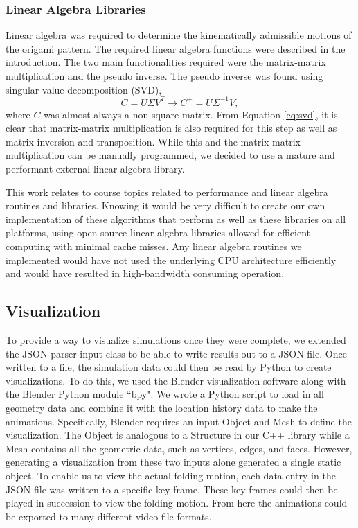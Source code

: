\subsubsection{Linear Algebra Libraries}
Linear algebra was required to determine the kinematically admissible motions of the origami pattern. The required linear algebra functions were described in the introduction. The two main functionalities required were the matrix-matrix multiplication and the pseudo inverse. The pseudo inverse was found using singular value decomposition (SVD),
\begin{equation} \label{eq:svd}
    C=U\Sigma V^T \longrightarrow C^+=U\Sigma ^{-1} V,
\end{equation}
where $C$ was almost always a non-square matrix. From Equation \ref{eq:svd}, it is clear that matrix-matrix multiplication is also required for this step as well as matrix inversion and transposition. While this and the matrix-matrix multiplication can be manually programmed, we decided to use a mature and performant external linear-algebra library. 

This work relates to course topics related to performance and linear algebra routines and libraries. Knowing it would be very difficult to create our own implementation of these algorithms that perform as well as these libraries on all platforms, using open-source linear algebra libraries allowed for efficient computing with minimal cache misses. Any linear algebra routines we implemented would have not used the underlying CPU architecture efficiently and would have resulted in high-bandwidth consuming operation.
\subsection{Visualization}
To provide a way to visualize simulations once they were complete, we extended the JSON parser input class to be able to write results out to a JSON file. Once written to a file, the simulation data could then be read by Python to create visualizations. To do this, we used the Blender visualization software along with the Blender Python module ``bpy". We wrote a Python script to load in all geometry data and combine it with the location history data to make the animations. Specifically, Blender requires an input Object and Mesh to define the visualization. The Object is analogous to a Structure in our C++ library while a Mesh contains all the geometric data, such as vertices, edges, and faces. However, generating a visualization from these two inputs alone generated a single static object. To enable us to view the actual folding motion, each data entry in the JSON file was written to a specific key frame. These key frames could then be played in succession to view the folding motion. From here the animations could be exported to many different video file formats.


